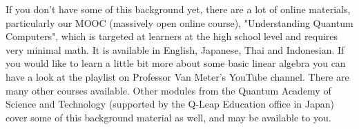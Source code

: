 If you don't have some of this background yet, there are a lot of online materials, particularly our MOOC (massively open online course), "Understanding Quantum Computers", which is targeted at learners at the high school level and requires very minimal math.
It is available in English, Japanese, Thai and Indonesian.
If you would like to learn a little bit more about some basic linear algebra you can have a look at the playlist on Professor Van Meter's YouTube channel. There are many other courses available. Other modules from the Quantum Academy of Science and Technology (supported by the Q-Leap Education office in Japan) cover some of this background material as well, and may be available to you.







